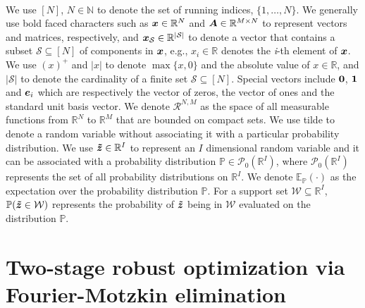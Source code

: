 \documentclass[fleqn,mnsc,blindrev]{informs4}
\newcommand{\mb}[1]{\mbox{\boldmath \ensuremath{#1}}}
\newcommand{\mbt}[1]{\mb{\tilde{#1}}}
\renewcommand{\Re}{\mathbb{R}}
\begin{document}
	
	\mbox{}\\
	We use $[N]$, $N \in \mathbb{N}$ to denote the set of running indices, $\{1,\dots,N\}$. We generally use bold faced characters such as $\mb{x} \in \Re^N$ and  $\mb{A} \in \Re^{M \times N}$  to represent  vectors and matrices, respectively, and $\mb{x}_{\mathcal{S}} \in \Re^{|\mathcal{S}|}$ to denote a vector that contains a subset  $\mathcal{S} \subseteq [N]$ of components in $\mb{x}$, e.g., $x_i \in \Re$ denotes the {\em i}-th element of $\mb{x}$. We use $(x)^+$ and $|x|$ to denote $\max\{x,0\}$ and the absolute value of $x \in \mathbb{R}$, and $|\mathcal{S}|$ to denote the cardinality of a finite set $\mathcal{S}\subseteq [N]$. Special vectors include $\mb{0}$, $\mb{1}$ and $\mb{e}_i$ which are respectively the vector of zeros, the  vector of ones and the standard unit basis vector.  We denote $\mathcal{R}^{N,M}$ as the space of all measurable functions from $\Re^N$ to $\Re^M$ that are bounded on compact sets. We use tilde to denote a random variable without associating it with a particular probability distribution. We use  $\mbt{z} \in \Re^{I}$ to represent an $I$ dimensional random variable and it  can be associated with a probability  distribution $\mathbb{P} \in \mathcal{P}_0(\Re^{I})$, where $\mathcal{P}_0(\Re^{I})$ represents the set of all probability distributions on $\Re^{I}$.
	We denote  $\mathbb{E}_{\mathbb{P}}(\cdot)$  as the expectation over the probability distribution $\mathbb{P}$. For a support set $\mathcal{W} \subseteq  \Re^{I}$,  $\mathbb{P}(  \mbt{z}  \in \mathcal{W})$ represents the probability  of $\mbt{z}$ being in $\mathcal{W}$ evaluated on the distribution $\mathbb{P}$.
	
\section{Two-stage robust optimization via Fourier-Motzkin elimination} \label{sec:FME}
	
\end{document}
